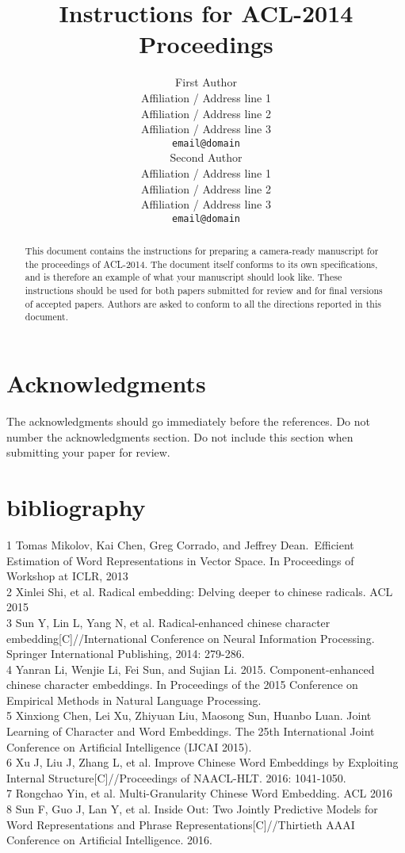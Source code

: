 \documentclass[11pt]{article}
\title{Instructions for ACL-2014 Proceedings}
\author{First Author \\
  Affiliation / Address line 1 \\
  Affiliation / Address line 2 \\
  Affiliation / Address line 3 \\
  {\tt email@domain} \\\And
  Second Author \\
  Affiliation / Address line 1 \\
  Affiliation / Address line 2 \\
  Affiliation / Address line 3 \\
  {\tt email@domain} \\}
\date{}
\begin{document}
\maketitle
\begin{abstract}
  This document contains the instructions for preparing a camera-ready
  manuscript for the proceedings of ACL-2014. The document itself
  conforms to its own specifications, and is therefore an example of
  what your manuscript should look like. These instructions should be
  used for both papers submitted for review and for final versions of
  accepted papers.  Authors are asked to conform to all the directions
  reported in this document.
\end{abstract}







\section*{Acknowledgments}

The acknowledgments should go immediately before the references.  Do
not number the acknowledgments section. Do not include this section
when submitting your paper for review.

%
%

\section{bibliography}

1 Tomas Mikolov, Kai Chen, Greg Corrado, and Jeffrey Dean. Efficient Estimation of Word Representations in Vector Space. In Proceedings of Workshop at ICLR, 2013\\
2 Xinlei Shi, et al. Radical embedding: Delving deeper to chinese radicals. ACL 2015\\
3 Sun Y, Lin L, Yang N, et al. Radical-enhanced chinese character embedding[C]//International Conference on Neural Information Processing. Springer International Publishing, 2014: 279-286.\\
4 Yanran Li, Wenjie Li, Fei Sun, and Sujian Li. 2015. Component-enhanced chinese character embeddings. In Proceedings of the 2015 Conference on Empirical Methods in Natural Language Processing.\\
5 Xinxiong Chen, Lei Xu, Zhiyuan Liu, Maosong Sun, Huanbo Luan. Joint Learning of Character and Word Embeddings. The 25th International Joint Conference on Artificial Intelligence (IJCAI 2015).\\
6 Xu J, Liu J, Zhang L, et al.  Improve Chinese Word Embeddings by Exploiting Internal Structure[C]//Proceedings of NAACL-HLT. 2016: 1041-1050.\\
7 Rongchao Yin, et al.  Multi-Granularity Chinese Word Embedding. ACL 2016\\
8 Sun F, Guo J, Lan Y, et al. Inside Out: Two Jointly Predictive Models for Word Representations and Phrase Representations[C]//Thirtieth AAAI Conference on Artificial Intelligence. 2016.\\
\end{document}
